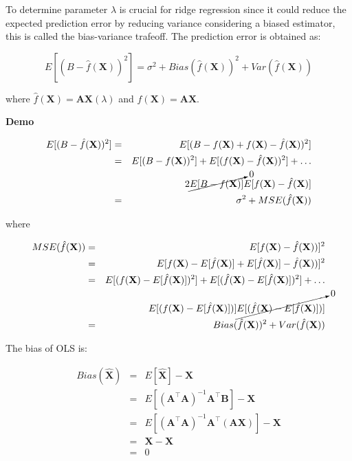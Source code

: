 To determine parameter $\lambda$ is crucial for ridge regression since it could
reduce the expected prediction error by reducing variance considering a biased
estimator, this is called the bias-variance trafeoff. The prediction error is
obtained as:

\begin{equation}
 \label{eq:prederror}
E[(B-\hat{f}(\mathbf{X}))^2] = \sigma^2 + Bias(\hat{f}(\mathbf{X}))^2 + Var(\hat{f}(\mathbf{X}))
\end{equation}

\noindent where $\hat{f}(\mathbf{X})=\mathbf{AX}(\lambda)$ and
$f(\mathbf{X})=\mathbf{AX}$.


\textbf{Demo}\quad

\begin{eqnarray*}
E[(B-\hat{f}(\mathbf{X}))^2] & =&
E[(B-f(\mathbf{X})+f(\mathbf{X})-\hat{f}(\mathbf{X}))^2] \\
&=& E[(B-f(\mathbf{X}))^2] +
E[(f(\mathbf{X})-\hat{f}(\mathbf{X}))^2] + \dots \\
& &
2\cancelto{0}{E[B-f(\mathbf{X})]}E[f(\mathbf{X})-\hat{f}(\mathbf{X})] \\
&=& \sigma^2 + MSE(\hat{f}(\mathbf{X}))
\end{eqnarray*}

\noindent where 

\begin{eqnarray*}
    MSE(\hat{f}(\mathbf{X})) &=&
    E[f(\mathbf{X})-\hat{f}(\mathbf{X}))]^2 \\
    &=& E[f(\mathbf{X})-E[\hat{f}(\mathbf{X})] +
    E[\hat{f}(\mathbf{X})]-\hat{f}(\mathbf{X}))]^2 \\
    &=&  E[(f(\mathbf{X})-E[\hat{f}(\mathbf{X})])^2] +
      E[(\hat{f}(\mathbf{X})-E[\hat{f}(\mathbf{X})])^2] + \dots\\
    & & E[(f(\mathbf{X})-E[\hat{f}(\mathbf{X})])] 
    \cancelto{0}{E[(\hat{f}(\mathbf{X})-E[\hat{f}(\mathbf{X})])]} \\
    &=& Bias(\hat{f}(\mathbf{X}))^2 + Var(\hat{f}(\mathbf{X}))
\end{eqnarray*}

The bias of OLS is:

\begin{eqnarray*}
Bias(\hat{\mathbf{X}}) &=& E[\hat{\mathbf{X}}] - \mathbf{X} \\
&=& E[ (\mathbf{A}^\top \mathbf{A})^{-1}\mathbf{A}^\top \mathbf{B}] - \mathbf{X} \\
&=& E[ (\mathbf{A}^\top \mathbf{A})^{-1}\mathbf{A}^\top (\mathbf{AX})] - \mathbf{X}  \\
&=& \mathbf{X}  - \mathbf{X}  \\
&=&  0
\end{eqnarray*}


